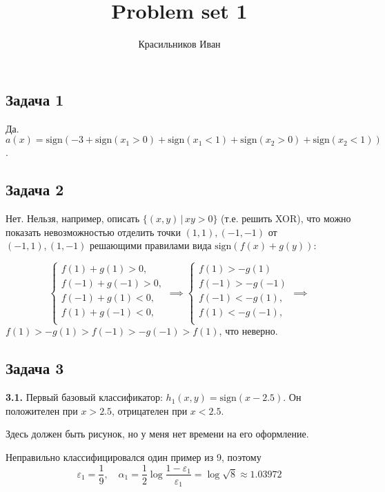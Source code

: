 \documentclass[a4paper, 12pt, onepage]{article}
\begin{document}
\author{Красильников Иван}
\title{Problem set 1}
\maketitle

\subsection*{Задача 1}
Да. $a(x) = \mbox{sign}\left(-3 + \mbox{sign}(x_1 > 0) + \mbox{sign}(x_1 < 1) + \mbox{sign}(x_2 > 0) + \mbox{sign}(x_2 < 1)\right)$.

\subsection*{Задача 2}
Нет. Нельзя, например, описать $\{ (x, y)\,|\,xy > 0 \}$ (т.е. решить XOR), что можно показать
невозможностью отделить точки $(1, 1), (-1, -1)$ от $(-1, 1), (1, -1)$ решающими правилами
вида $\mbox{sign}(f(x) + g(y))$:

$$
\begin{cases}
f(1) + g(1) > 0, \\
f(-1) + g(-1) > 0, \\
f(-1) + g(1) < 0, \\
f(1) + g(-1) < 0, \\
\end{cases}
\implies
\begin{cases}
f(1) > -g(1) \\
f(-1) > -g(-1) \\
f(-1) < -g(1), \\
f(1) < -g(-1), \\
\end{cases}
\implies
$$
$f(1) > -g(1) > f(-1) > -g(-1) > f(1)$, что неверно.


\newpage
\subsection*{Задача 3}

\textbf{3.1.} Первый базовый классификатор: $h_1(x, y) = \mbox{sign}(x - 2.5)$. Он положителен при $x > 2.5$, отрицателен при $x < 2.5$.

\begin{center}\textcolor[gray]{0.8}{Здесь должен быть рисунок, но у меня нет времени на его оформление.}\end{center}

Неправильно классифицировался один пример из 9, поэтому
$$\varepsilon_1 = \frac 19, \quad \alpha_1 = \frac12 \log \frac{1-\varepsilon_1}{\varepsilon_1} = \log \sqrt{8} \approx 1.03972$$
\end{document}
